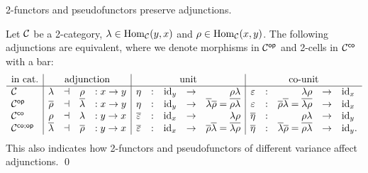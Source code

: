 \documentclass[a4paper]{memoir}
\begin{document}
\begin{corollary}
	2-functors and pseudofunctors preserve adjunctions.
\end{corollary}
\begin{proposition}
	Let ${\mathcal{C}}$ be a 2-category, $\lambda \in {\mathrm{Hom}}_{\mathcal{C}}(y, x)$ and $\rho \in {\mathrm{Hom}}_{\mathcal{C}}(x, y)$. The following adjunctions are equivalent, where we denote morphisms in ${\mathcal{C}}^{\mathsf{op}}$ and 2-cells in ${\mathcal{C}}^{\mathsf{co}}$ with a bar:
	\[
		\begin{array}{l | c c c l | c c r c r | c c r c l}
			\text{in cat.}
			& \multicolumn{4}{c |}{\text{adjunction}}
			& \multicolumn{5}{c |}{\text{unit}}
			& \multicolumn{5}{c}{\text{co-unit}}
			\\ \hline
			\catC
			& \lambda &\dashv& \rho &: x \to y
			& \eta &:& \id_y &\to& \rho \lambda
			& \eps &:& \lambda \rho &\to& \id_x
			\\
			\catC\op
			& \overline \rho &\dashv& \overline \lambda &: x \to y
			& \eta &:& \id_y &\to& \overline \lambda \overline \rho = \overline{\rho \lambda}
			& \eps &:& \overline \rho \overline \lambda = \overline{\lambda \rho} &\to& \id_x
			\\
			\catC\co
			& \rho &\dashv& \lambda &: y \to x
			& \overline \eps &:& \id_x &\to& \lambda \rho
			& \overline \eta &:& \rho \lambda &\to& \id_y
			\\
			\catC\coop
			& \overline \lambda &\dashv& \overline \rho &: y \to x
			& \overline \eps &:& \id_x &\to& \overline \rho \overline \lambda = \overline{\lambda \rho}
			& \overline \eta &:& \overline \lambda \overline \rho = \overline{\rho \lambda} &\to& \id_y.
		\end{array}
	\]
	This also indicates how 2-functors and pseudofunctors of different variance affect adjunctions. \qed
\end{proposition}
\end{document}
